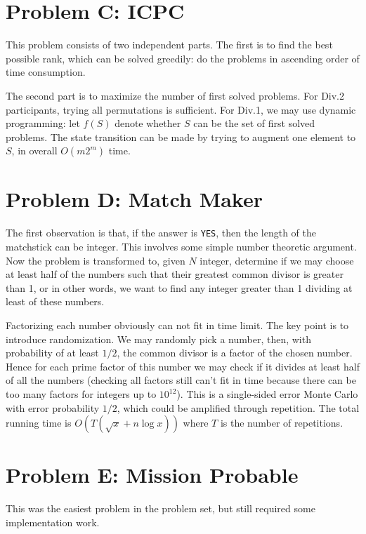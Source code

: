 \documentclass[a4paper,10.5pt,twoside]{article}
\begin{document}
\section*{Problem C: ICPC}

This problem consists of two independent parts. The first is to find the best possible rank, which can be solved greedily: do the problems in ascending order of time consumption.

The second part is to maximize the number of first solved problems. For Div.2 participants, trying all permutations is sufficient. For Div.1, we may use dynamic programming: let $f(S)$ denote whether $S$ can be the set of first solved problems. The state transition can be made by trying to augment one element to $S$, in overall $O(m 2^m)$ time.

\section*{Problem D: Match Maker}

The first observation is that, if the answer is \texttt{YES}, then the length of the matchstick can be integer. This involves some simple number theoretic argument. Now the problem is transformed to, given $N$ integer, determine if we may choose at least half of the numbers such that their greatest common divisor is greater than 1, or in other words, we want to find any integer greater than 1 dividing at least of these numbers.

Factorizing each number obviously can not fit in time limit. The key point is to introduce randomization. We may randomly pick a number, then, with probability of at least $1/2$, the common divisor is a factor of the chosen number. Hence for each prime factor of this number we may check if it divides at least half of all the numbers (checking all factors still can't fit in time because there can be too many factors for integers up to $10^{12}$). This is a single-sided error Monte Carlo with error probability $1/2$, which could be amplified through repetition. The total running time is $O(T(\sqrt{x} + n \log x))$ where $T$ is the number of repetitions.

\section*{Problem E: Mission Probable}

This was the easiest problem in the problem set, but still required some implementation work.
\end{document}
